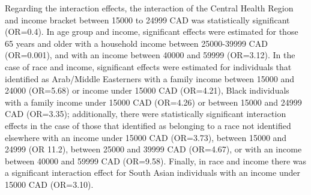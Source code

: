 \documentclass[
  letterpaper,
  DIV=11,
  numbers=noendperiod]{scrartcl}
\begin{document}
Regarding the interaction effects, the interaction of the Central Health
Region and income bracket between 15000 to 24999 CAD was statistically
significant (OR=0.4). In age group and income, significant effects were
estimated for those 65 years and older with a household income between
25000-39999 CAD (OR=0.001), and with an income between 40000 and 59999
(OR=3.12). In the case of race and income, significant effects were
estimated for individuals that identified as Arab/Middle Easterners with
a family income between 15000 and 24000 (OR=5.68) or income under 15000
CAD (OR=4.21), Black individuals with a family income under 15000 CAD
(OR=4.26) or between 15000 and 24999 CAD (OR=3.35); additionally, there
were statistically significant interaction effects in the case of those
that identified as belonging to a race not identified elsewhere with an
income under 15000 CAD (OR=3.73), between 15000 and 24999 (OR 11.2),
between 25000 and 39999 CAD (OR=4.67), or with an income between 40000
and 59999 CAD (OR=9.58). Finally, in race and income there was a
significant interaction effect for South Asian individuals with an
income under 15000 CAD (OR=3.10).
\end{document}
